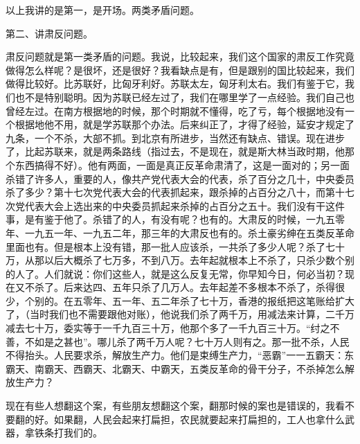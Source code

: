 以上我讲的是第一，是开场。两类矛盾问题。

第二、讲肃反问题。

肃反问题就是第一类矛盾的问题。我说，比较起来，我们这个国家的肃反工作究竟做得怎么样呢？是很坏，还是很好？我看缺点是有，但是跟别的国比较起来，我们做得比较好。比苏联好，比匈牙利好。苏联太左，匈牙利太右。我们有鉴于它，我们也不是特别聪明。因为苏联已经左过了，我们在哪里学了一点经验。我们自己也曾经左过。在南方根据地的时候，那个时期就不懂得，吃了亏，每个根据地没有一个根据地他不用，就是学苏联那个办法。后来纠正了，才得了经验，延安才规定了九条，一个不杀，大部不抓。到北京有所进步，当然还有缺点、错误。现在进步了，比起苏联来，就是两条路线（指过去，不是现在，就是斯大林当政时期，他那个东西搞得不好）。他有两面，一面是真正反革命肃清了，这是一面对的；另一面杀错了许多人，重要的人，像共产党代表大会的代表，杀了百分之几十，中央委员杀了多少？第十七次党代表大会的代表抓起来，跟杀掉的占百分之八十，而第十七次党代表大会上选出来的中央委员抓起来杀掉的占百分之五十。我们没有干这件事，是有鉴于他了。杀错了的人，有没有呢？也有的。大肃反的时候，一九五零年、一九五一年、一九五二年，那三年的大肃反也有的。杀土豪劣绅在五类反革命里面也有。但是根本上没有错，那一批人应该杀，一共杀了多少人呢？杀了七十万，从那以后大概杀了七万多，不到八万。去年起就根本上不杀了，只杀少数个别的人了。人们就说：你们这些人，就是这么反复无常，你早知今日，何必当初？现在又不杀了。后来达四、五年只杀了几万人。去年起差不多根本不杀了，杀得很少，个别的。在五零年、五一年、五二年杀了七十万，香港的报纸把这笔账给扩大了，（当时我们也不需要跟他对账），他说我们杀了两千万，用减法来计算，二千万减去七十万，委实等于一千九百三十万，他那个多了一千九百三十万。“纣之不善，不如是之甚也”。哪儿杀了两千万人呢？七十万人则有之。那一批不杀，人民不得抬头。人民要求杀，解放生产力。他们是束缚生产力，“恶霸”一一五霸天：东霸天、南霸天、西霸天、北霸天、中霸天，五类反革命的骨干分子，不杀掉怎么解放生产力？

现在有些人想翻这个案，有些朋友想翻这个案，翻那时候的案也是错误的，我看不要翻的好。如果翻，人民会起来打扁担，农民就要起来打扁担的，工人也拿什么武器，拿铁条打我们的。

